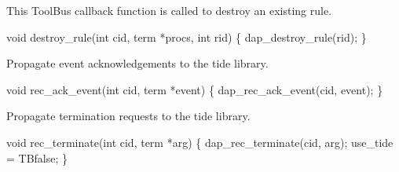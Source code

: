 This ToolBus callback function is called to destroy an existing rule.

\nwenddocs{}\endmoddef\let\nwnotused=\nwoutput{}
void destroy_rule(int cid, term *procs, int rid)
\{
  dap_destroy_rule(rid);
\}
\nwendcode{}\nwdocspar



Propagate event acknowledgements to the tide library.

\nwenddocs{}\endmoddef\let\nwnotused=\nwoutput{}
void rec_ack_event(int cid, term *event)
\{
  dap_rec_ack_event(cid, event);
\}
\nwendcode{}\nwdocspar


Propagate termination requests to the tide library.

\nwenddocs{}\endmoddef\let\nwnotused=\nwoutput{}
void rec_terminate(int cid, term *arg)
\{
  dap_rec_terminate(cid, arg);
  use_tide = TBfalse;
\}
\nwendcode{}


